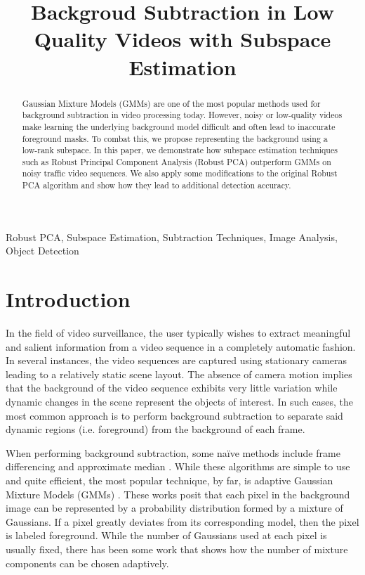 \documentclass{article}
\title{Backgroud Subtraction in Low Quality Videos with Subspace Estimation}
\begin{document}
%
\maketitle
%
\begin{abstract}
Gaussian Mixture Models (GMMs) are one of the most popular methods used for background subtraction in video processing today. However, noisy or low-quality videos make learning the underlying background model difficult and often lead to inaccurate foreground masks. To combat this, we propose representing the background using a low-rank subspace. In this paper, we demonstrate how subspace estimation techniques such as Robust Principal Component Analysis (Robust PCA) outperform GMMs on noisy traffic video sequences. We also apply some modifications to the original Robust PCA algorithm and show how they lead to additional detection accuracy.
\end{abstract}
%
\begin{keywords}
Robust PCA, Subspace Estimation,  Subtraction Techniques, Image Analysis, Object Detection
\end{keywords}
%

\vspace{0.1in}

\section{Introduction}
In the field of video surveillance, the user typically wishes to extract meaningful and salient information from a video sequence in a completely automatic fashion. In several instances, the video sequences are captured using stationary cameras leading to a relatively static scene layout. The absence of camera motion implies that the background of the video sequence exhibits very little variation while dynamic changes in the scene represent the objects of interest. In such cases, the most common approach is to perform background subtraction to separate said dynamic regions (i.e. foreground) from the background of each frame.

When performing background subtraction, some na\"ive methods include frame differencing and approximate median \cite{approxMed}. %
While these algorithms are simple to use and quite efficient, the most popular technique, by far, is adaptive  Gaussian Mixture Models (GMMs) \cite{FriedmanGMM, StaufferGMM}. These works posit that each pixel in the background image can be represented by a probability distribution formed by a mixture of Gaussians. If a pixel greatly deviates from its corresponding model, then the pixel is labeled foreground. While the number of Gaussians used at each pixel is usually fixed, there has been some work \cite{ZivGMM} that shows how the number of mixture components can be chosen adaptively.
\end{document}
